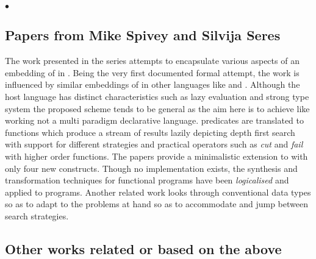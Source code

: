 \documentclass[thesis-solanki.tex]{subfiles}
\begin{document}
$\bullet$
  \subsection{Papers from Mike Spivey and Silvija Seres}


  The work presented in the series
  \cite{spivey1999embedding,seres1999algebra,seres2001higher,spivey1999algebra,seres2001algebra} attempts to
  encapsulate various aspects of an embedding of  in .
  Being the very first documented formal attempt, the work is influenced by similar embeddings of 
  in other languages like  and .
  Although the host language has distinct characteristics such as lazy evaluation and strong type system the
  proposed scheme tends to be general as the aim here is to achieve  like working not a multi
  paradigm declarative language.
   predicates are translated to  functions which produce a stream of results
  lazily depicting depth first search with support for different strategies and practical operators such as
  \textit{cut} and \textit{fail} with higher order functions.
  The papers provide a minimalistic extension to  with only four new constructs.
  Though no implementation exists, the synthesis and transformation techniques for functional programs have been
  \textit{logicalised} and applied to  programs.
  Another related work \cite{spivey2000functional} looks through conventional data types so as to adapt to the
  problems at hand
  so as to accommodate and jump between search strategies.


  \subsection{Other works related or based on the above}

\end{document}
